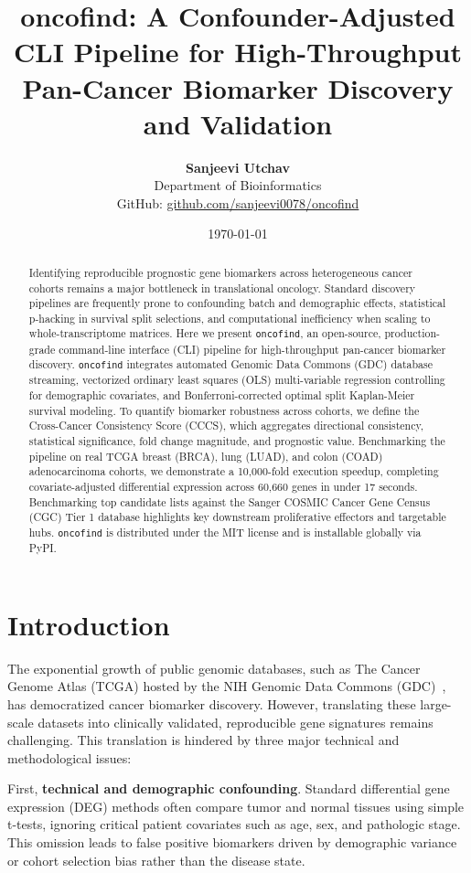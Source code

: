 \documentclass[11pt,a4paper]{article}
\title{\textbf{oncofind: A Confounder-Adjusted CLI Pipeline for High-Throughput Pan-Cancer Biomarker Discovery and Validation}}
\author{\textbf{Sanjeevi Utchav} \\
\small{Department of Bioinformatics} \\
\small{GitHub: \href{https://github.com/sanjeevi0078/oncofind}{github.com/sanjeevi0078/oncofind}}
}
\date{\today}
\begin{document}
\maketitle

\begin{abstract}
Identifying reproducible prognostic gene biomarkers across heterogeneous cancer cohorts remains a major bottleneck in translational oncology. Standard discovery pipelines are frequently prone to confounding batch and demographic effects, statistical p-hacking in survival split selections, and computational inefficiency when scaling to whole-transcriptome matrices. Here we present \texttt{oncofind}, an open-source, production-grade command-line interface (CLI) pipeline for high-throughput pan-cancer biomarker discovery. \texttt{oncofind} integrates automated Genomic Data Commons (GDC) database streaming, vectorized ordinary least squares (OLS) multi-variable regression controlling for demographic covariates, and Bonferroni-corrected optimal split Kaplan-Meier survival modeling. To quantify biomarker robustness across cohorts, we define the Cross-Cancer Consistency Score (CCCS), which aggregates directional consistency, statistical significance, fold change magnitude, and prognostic value. Benchmarking the pipeline on real TCGA breast (BRCA), lung (LUAD), and colon (COAD) adenocarcinoma cohorts, we demonstrate a 10,000-fold execution speedup, completing covariate-adjusted differential expression across 60,660 genes in under 17 seconds. Benchmarking top candidate lists against the Sanger COSMIC Cancer Gene Census (CGC) Tier 1 database highlights key downstream proliferative effectors and targetable hubs. \texttt{oncofind} is distributed under the MIT license and is installable globally via PyPI.
\end{abstract}

\section{Introduction}
The exponential growth of public genomic databases, such as The Cancer Genome Atlas (TCGA) hosted by the NIH Genomic Data Commons (GDC)~\cite{gdc2016, tcga2018}, has democratized cancer biomarker discovery. However, translating these large-scale datasets into clinically validated, reproducible gene signatures remains challenging. This translation is hindered by three major technical and methodological issues:

First, \textbf{technical and demographic confounding}. Standard differential gene expression (DEG) methods often compare tumor and normal tissues using simple t-tests, ignoring critical patient covariates such as age, sex, and pathologic stage. This omission leads to false positive biomarkers driven by demographic variance or cohort selection bias rather than the disease state.
\end{document}

